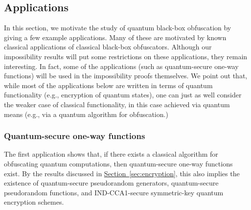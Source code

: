 \documentclass[11pt]{article}
\numberwithin{equation}{section}
\newcommand{\expref}[2]{\texorpdfstring{\hyperref[#2]{#1~\ref{#2}}}{#1~\ref{#2}}}
\begin{document}
{\subsection{Applications}\label{sec:vbb-applications}

In this section, we motivate the study of quantum black-box obfuscation by giving a few example applications. Many of these are motivated by known classical applications of classical black-box obfuscators. Although our impossibility results will put some restrictions on these applications, they remain interesting. In fact, some of the applications (such as quantum-secure one-way functions) will be used in the impossibility proofs themselves. We point out that, while most of the applications below are written in terms of quantum functionality (e.g., encryption of quantum states), one can just as well consider the weaker case of classical functionality, in this case achieved via quantum means (e.g., via a quantum algorithm for obfuscation.)

\subsubsection{Quantum-secure one-way functions}

The first application shows that, if there exists a classical algorithm for obfuscating quantum computations, then quantum-secure one-way functions exist. By the results discussed in \expref{Section}{sec:encryption}, this also implies the existence of quantum-secure pseudorandom generators, quantum-secure pseudorandom functions, and IND-CCA1-secure symmetric-key quantum encryption schemes.

}
\end{document}
